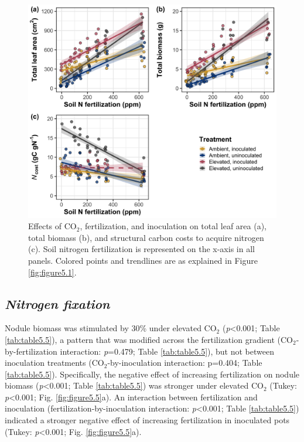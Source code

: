 \newpage
\begin{figure}
    \centering
    \includegraphics[scale = 0.074]{ch5_NxCO2xI/figs/NxCO2xI_fig4_wholePlant.png}
    \caption[Effects of CO$_2$, fertilization, and inoculation on total leaf area, total biomass, and structural carbon costs to acquire nitrogen]{Effects of CO$_2$, fertilization, and inoculation on total leaf area (a), total biomass (b), and structural carbon costs to acquire nitrogen (c). Soil nitrogen fertilization is represented on the x-axis in all panels. Colored points and trendlines are as explained in Figure \ref{fig:figure5.1}.}
    \label{fig:figure5.4}
\end{figure}
\clearpage

\subsection{\textit{Nitrogen fixation}}
\noindent Nodule biomass was stimulated by 30\% under elevated CO$_2$ (\textit{p}<0.001; Table \ref{tab:table5.5}), a pattern that was modified across the fertilization gradient (CO$_2$-by-fertilization interaction: \textit{p}=0.479; Table \ref{tab:table5.5}), but not between inoculation treatments (CO$_2$-by-inoculation interaction: p=0.404; Table \ref{tab:table5.5}). Specifically, the negative effect of increasing fertilization on nodule biomass (\textit{p}<0.001; Table \ref{tab:table5.5}) was stronger under elevated CO$_2$ (Tukey: \textit{p}<0.001; Fig. \ref{fig:figure5.5}a). An interaction between fertilization and inoculation (fertilization-by-inoculation interaction: \textit{p}<0.001; Table \ref{tab:table5.5}) indicated a stronger negative effect of increasing fertilization in inoculated pots (Tukey: \textit{p}<0.001; Fig. \ref{fig:figure5.5}a).

